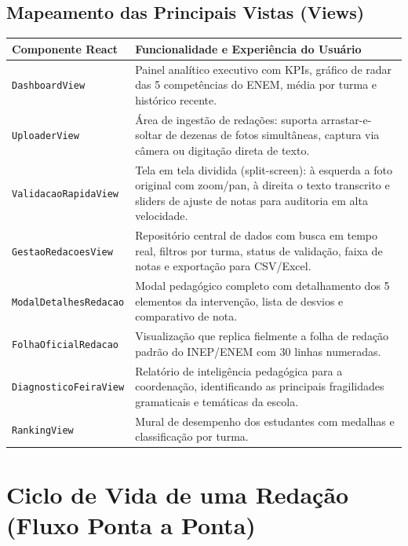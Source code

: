 \documentclass[11pt,a4paper]{article}
\begin{document}
\subsection{Mapeamento das Principais Vistas (Views)}
\begin{center}
\begin{tabularx}{\textwidth}{l p{10.5cm}}
\toprule
\textbf{Componente React} & \textbf{Funcionalidade e Experiência do Usuário} \\
\midrule
\texttt{DashboardView} & Painel analítico executivo com KPIs, gráfico de radar das 5 competências do ENEM, média por turma e histórico recente. \\
\texttt{UploaderView} & Área de ingestão de redações: suporta arrastar-e-soltar de dezenas de fotos simultâneas, captura via câmera ou digitação direta de texto. \\
\texttt{ValidacaoRapidaView} & Tela em tela dividida (split-screen): à esquerda a foto original com zoom/pan, à direita o texto transcrito e sliders de ajuste de notas para auditoria em alta velocidade. \\
\texttt{GestaoRedacoesView} & Repositório central de dados com busca em tempo real, filtros por turma, status de validação, faixa de notas e exportação para CSV/Excel. \\
\texttt{ModalDetalhesRedacao} & Modal pedagógico completo com detalhamento dos 5 elementos da intervenção, lista de desvios e comparativo de nota. \\
\texttt{FolhaOficialRedacao} & Visualização que replica fielmente a folha de redação padrão do INEP/ENEM com 30 linhas numeradas. \\
\texttt{DiagnosticoFeiraView} & Relatório de inteligência pedagógica para a coordenação, identificando as principais fragilidades gramaticais e temáticas da escola. \\
\texttt{RankingView} & Mural de desempenho dos estudantes com medalhas e classificação por turma. \\
\bottomrule
\end{tabularx}
\end{center}

\section{Ciclo de Vida de uma Redação (Fluxo Ponta a Ponta)}
\end{document}
